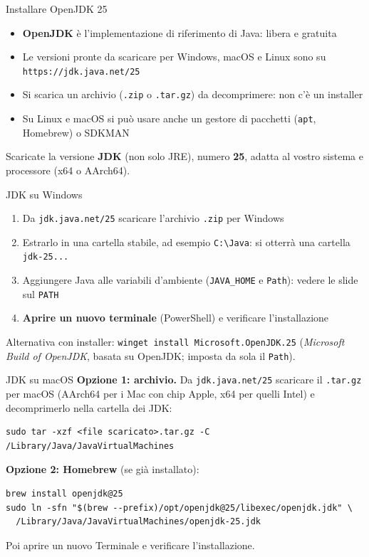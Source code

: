 \documentclass[aspectratio=169,10pt,t]{beamer}
\begin{document}
\begin{frame}{Installare OpenJDK 25}
  \begin{itemize}
    \item \textbf{OpenJDK} \`e l'implementazione di riferimento di Java: libera e gratuita
    \item Le versioni pronte da scaricare per Windows, macOS e Linux sono su \texttt{https://jdk.java.net/25}
    \item Si scarica un archivio (\texttt{.zip} o \texttt{.tar.gz}) da decomprimere: non c'\`e un installer
    \item Su Linux e macOS si pu\`o usare anche un gestore di pacchetti (\texttt{apt}, Homebrew) o SDKMAN
  \end{itemize}
  \vspace{0.5em}
  \begin{errore}
    Scaricate la versione \textbf{JDK} (non solo JRE), numero \textbf{25}, adatta al vostro sistema e processore (x64 o AArch64).
  \end{errore}
\end{frame}

\begin{frame}{JDK su Windows}
  \begin{enumerate}
    \item Da \texttt{jdk.java.net/25} scaricare l'archivio \texttt{.zip} per Windows
    \item Estrarlo in una cartella stabile, ad esempio \texttt{C:\textbackslash Java}: si otterr\`a una cartella \texttt{jdk-25...}
    \item Aggiungere Java alle variabili d'ambiente (\texttt{JAVA\_HOME} e \texttt{Path}): vedere le slide sul \texttt{PATH}
    \item \textbf{Aprire un nuovo terminale} (PowerShell) e verificare l'installazione
  \end{enumerate}
  \vspace{0.5em}
  Alternativa con installer: \texttt{winget install Microsoft.OpenJDK.25} (\emph{Microsoft Build of OpenJDK}, basata su OpenJDK; imposta da sola il \texttt{Path}).
\end{frame}

\begin{frame}[fragile]{JDK su macOS}
  \textbf{Opzione 1: archivio.} Da \texttt{jdk.java.net/25} scaricare il \texttt{.tar.gz} per macOS (AArch64 per i Mac con chip Apple, x64 per quelli Intel) e decomprimerlo nella cartella dei JDK:
\begin{lstlisting}[language={},numbers=none]
sudo tar -xzf <file scaricato>.tar.gz -C /Library/Java/JavaVirtualMachines
\end{lstlisting}
  \textbf{Opzione 2: Homebrew} (se gi\`a installato):
\begin{lstlisting}[language={},numbers=none]
brew install openjdk@25
sudo ln -sfn "$(brew --prefix)/opt/openjdk@25/libexec/openjdk.jdk" \
  /Library/Java/JavaVirtualMachines/openjdk-25.jdk
\end{lstlisting}
  Poi aprire un nuovo Terminale e verificare l'installazione.
\end{frame}
\end{document}
